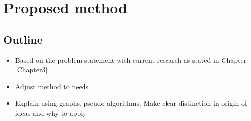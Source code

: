 
\chapter{Proposed method}

\label{Chapter4} %


\section{Outline}
\begin{itemize}
  \item Based on the problem statement with current research as stated in Chapter \ref{Chapter3}
  \item Adjust method to needs
  \item Explain using graphs, pseudo-algorithms. Make clear distinction in origin of ideas and why to apply
\end{itemize}